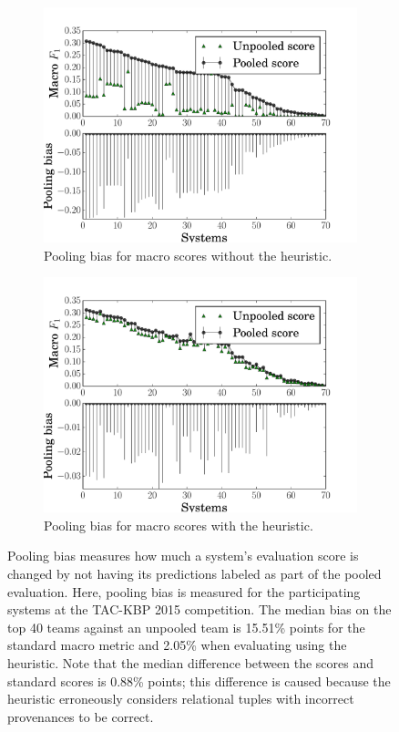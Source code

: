 \begin{figure}[t]
  \begin{subfigure}{\columnwidth}
  \includegraphics[width=\columnwidth]{figures/pooling_bias/pooling_bias_closed-world}
  \caption{Pooling bias for macro \fone{} scores without the \anydoc{} heuristic.}
  \end{subfigure}
  \begin{subfigure}{\columnwidth}
  \includegraphics[width=\columnwidth]{figures/pooling_bias/pooling_bias_anydoc}
  \caption{Pooling bias for macro \fone{} scores with the \anydoc{} heuristic.}
  \end{subfigure}
  \caption{\label{fig:pooling-bias} Pooling bias measures how much a system's evaluation score is changed by not having its predictions labeled as part of the pooled evaluation.
  Here, pooling bias is measured for the participating systems at the TAC-KBP 2015 competition.
  The median bias on the top 40 teams against an unpooled team is 15.51\% points for the standard macro \fone{} metric and 2.05\% when evaluating using the \anydoc{} heuristic.
  Note that the median difference between the \anydoc{} scores and standard scores is 0.88\% points; this difference is caused because the \anydoc{} heuristic erroneously considers relational tuples with incorrect provenances to be correct.}
\end{figure}

